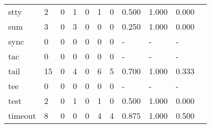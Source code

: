 \begin{longtable}{lp{1.10cm}p{1.10cm}p{1.10cm}p{1.10cm}p{1.10cm}p{1.10cm}p{1.10cm}p{1.10cm}p{1.10cm}p{1.10cm}}
stty      &                      2 &                                  0 &                                 1 &                                0 &                                 1 &                               0 &                          0.500 &                                 1.000 &                               0.000 \\
sum       &                      3 &                                  0 &                                 3 &                                0 &                                 0 &                               0 &                          0.250 &                                 1.000 &                               0.000 \\
sync      &                      0 &                                  0 &                                 0 &                                0 &                                 0 &                               0 &                              - &                                     - &                                   - \\
tac       &                      0 &                                  0 &                                 0 &                                0 &                                 0 &                               0 &                              - &                                     - &                                   - \\
tail      &                     15 &                                  0 &                                 4 &                                0 &                                 6 &                               5 &                          0.700 &                                 1.000 &                               0.333 \\
tee       &                      0 &                                  0 &                                 0 &                                0 &                                 0 &                               0 &                              - &                                     - &                                   - \\
test      &                      2 &                                  0 &                                 1 &                                0 &                                 1 &                               0 &                          0.500 &                                 1.000 &                               0.000 \\
timeout   &                      8 &                                  0 &                                 0 &                                0 &                                 4 &                               4 &                          0.875 &                                 1.000 &                               0.500 \\

\end{longtable}
